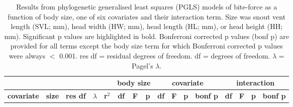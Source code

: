 
\begin{longtable}{lccccccccccccccc}

\caption{Results from phylogenetic generalised least squares (PGLS) models of bite-force as a function of body size, one of six covariates and their interaction term. Size was snout vent length (SVL; mm), head width (HW; mm), head length (HL; mm), or head height (HH; mm). Significant p values are highlighted in bold. Bonferroni corrected p values (bonf p) are provided for all terms except the body size term for which Bonferroni corrected p values were always $<$ 0.001. res df = residual degrees of freedom. df = degrees of freedom. $\lambda$ = Pagel's $\lambda$.}\\ 


\hline

\multicolumn{5}{c}{} &
\multicolumn{3}{c}{\textbf{body size}} &
\multicolumn{4}{c}{\textbf{covariate}} &
\multicolumn{4}{c}{\textbf{interaction}}\\

  \hline
  \textbf{covariate} &
  \textbf{size} &
  \textbf{res df} &
  \textbf{$\lambda$} &
  \textbf{r$^2$} &
  \textbf{df} &
  \textbf{F} &
  \textbf{p} &
  \textbf{df} &
  \textbf{F} &
  \textbf{p} &
  \textbf{bonf p} &
  \textbf{df} &
  \textbf{F} &
  \textbf{p} &
  \textbf{bonf p} \\


\end{longtable}
